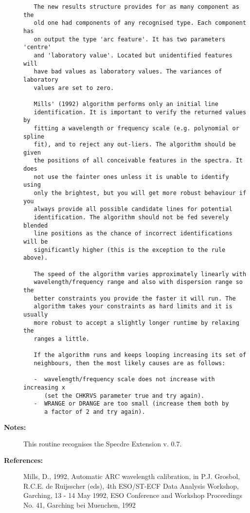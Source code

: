 \begin{description}
\begin{verbatim}
   The new results structure provides for as many component as the
   old one had components of any recognised type. Each component has
   on output the type 'arc feature'. It has two parameters 'centre'
   and 'laboratory value'. Located but unidentified features will
   have bad values as laboratory values. The variances of laboratory
   values are set to zero.

   Mills' (1992) algorithm performs only an initial line
   identification. It is important to verify the returned values by
   fitting a wavelength or frequency scale (e.g. polynomial or spline
   fit), and to reject any out-liers. The algorithm should be given
   the positions of all conceivable features in the spectra. It does
   not use the fainter ones unless it is unable to identify using
   only the brightest, but you will get more robust behaviour if you
   always provide all possible candidate lines for potential
   identification. The algorithm should not be fed severely blended
   line positions as the chance of incorrect identifications will be
   significantly higher (this is the exception to the rule above).

   The speed of the algorithm varies approximately linearly with
   wavelength/frequency range and also with dispersion range so the
   better constraints you provide the faster it will run. The
   algorithm takes your constraints as hard limits and it is usually
   more robust to accept a slightly longer runtime by relaxing the
   ranges a little.

   If the algorithm runs and keeps looping increasing its set of
   neighbours, then the most likely causes are as follows:

   -  wavelength/frequency scale does not increase with increasing x
      (set the CHKRVS parameter true and try again).
   -  WRANGE or DRANGE are too small (increase them both by
      a factor of 2 and try again).
\end{verbatim}

\item [{\bf Notes:}]
  This routine recognises the Specdre Extension v. 0.7.


\item [{\bf References:}]
   Mills, D., 1992, Automatic ARC wavelength calibration, in P.J.
   Grosbol, R.C.E. de Ruijsscher (eds), 4th ESO/ST-ECF Data
   Analysis Workshop, Garching, 13 - 14 May 1992, ESO Conference and
   Workshop Proceedings No. 41, Garching bei Muenchen, 1992
\end{description}
